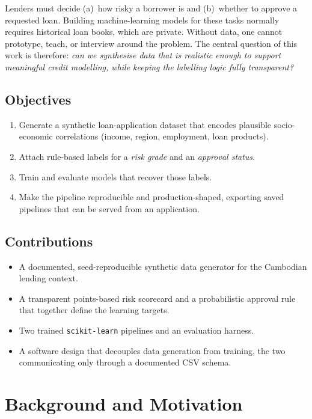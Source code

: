 \documentclass[conference]{IEEEtran}
\begin{document}
Lenders must decide (a)~how risky a borrower is and (b)~whether to approve a
requested loan. Building machine-learning models for these tasks normally
requires historical loan books, which are private. Without data, one cannot
prototype, teach, or interview around the problem. The central question of this
work is therefore: \emph{can we synthesise data that is realistic enough to
support meaningful credit modelling, while keeping the labelling logic fully
transparent?}

\subsection{Objectives}
\begin{enumerate}
  \item Generate a synthetic loan-application dataset that encodes plausible
        socio-economic correlations (income, region, employment, loan
        products).
  \item Attach rule-based labels for a \emph{risk grade} and an \emph{approval
        status}.
  \item Train and evaluate models that recover those labels.
  \item Make the pipeline reproducible and production-shaped, exporting saved
        pipelines that can be served from an application.
\end{enumerate}

\subsection{Contributions}
\begin{itemize}
  \item A documented, seed-reproducible synthetic data generator for the
        Cambodian lending context.
  \item A transparent points-based risk scorecard and a probabilistic approval
        rule that together define the learning targets.
  \item Two trained \texttt{scikit-learn} pipelines and an evaluation harness.
  \item A software design that decouples data generation from training, the two
        communicating only through a documented CSV schema.
\end{itemize}

\section{Background and Motivation}
\end{document}
